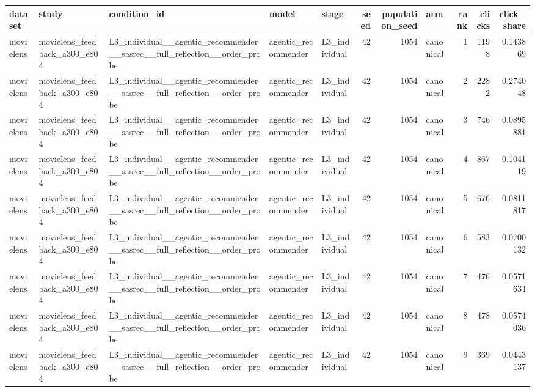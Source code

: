 \begin{table}[htbp!]
\centering
\small
\setlength{\tabcolsep}{3pt}
\renewcommand{\arraystretch}{1.1}
\begin{tabular}{lllllrrlrrr}
\hline
dataset & study & condition\_id & model & stage & seed & population\_seed & arm & rank & clicks & click\_share \\
\hline
movielens & movielens\_feedback\_a300\_e804 & L3\_individual\_\_agentic\_recommender\_\_sasrec\_\_full\_reflection\_\_order\_probe & agentic\_recommender & L3\_individual & 42 & 1054 & canonical & 1 & 1198 & 0.143869 \\
movielens & movielens\_feedback\_a300\_e804 & L3\_individual\_\_agentic\_recommender\_\_sasrec\_\_full\_reflection\_\_order\_probe & agentic\_recommender & L3\_individual & 42 & 1054 & canonical & 2 & 2282 & 0.274048 \\
movielens & movielens\_feedback\_a300\_e804 & L3\_individual\_\_agentic\_recommender\_\_sasrec\_\_full\_reflection\_\_order\_probe & agentic\_recommender & L3\_individual & 42 & 1054 & canonical & 3 & 746 & 0.0895881 \\
movielens & movielens\_feedback\_a300\_e804 & L3\_individual\_\_agentic\_recommender\_\_sasrec\_\_full\_reflection\_\_order\_probe & agentic\_recommender & L3\_individual & 42 & 1054 & canonical & 4 & 867 & 0.104119 \\
movielens & movielens\_feedback\_a300\_e804 & L3\_individual\_\_agentic\_recommender\_\_sasrec\_\_full\_reflection\_\_order\_probe & agentic\_recommender & L3\_individual & 42 & 1054 & canonical & 5 & 676 & 0.0811817 \\
movielens & movielens\_feedback\_a300\_e804 & L3\_individual\_\_agentic\_recommender\_\_sasrec\_\_full\_reflection\_\_order\_probe & agentic\_recommender & L3\_individual & 42 & 1054 & canonical & 6 & 583 & 0.0700132 \\
movielens & movielens\_feedback\_a300\_e804 & L3\_individual\_\_agentic\_recommender\_\_sasrec\_\_full\_reflection\_\_order\_probe & agentic\_recommender & L3\_individual & 42 & 1054 & canonical & 7 & 476 & 0.0571634 \\
movielens & movielens\_feedback\_a300\_e804 & L3\_individual\_\_agentic\_recommender\_\_sasrec\_\_full\_reflection\_\_order\_probe & agentic\_recommender & L3\_individual & 42 & 1054 & canonical & 8 & 478 & 0.0574036 \\
movielens & movielens\_feedback\_a300\_e804 & L3\_individual\_\_agentic\_recommender\_\_sasrec\_\_full\_reflection\_\_order\_probe & agentic\_recommender & L3\_individual & 42 & 1054 & canonical & 9 & 369 & 0.0443137 \\

\end{tabular}
\end{table}
